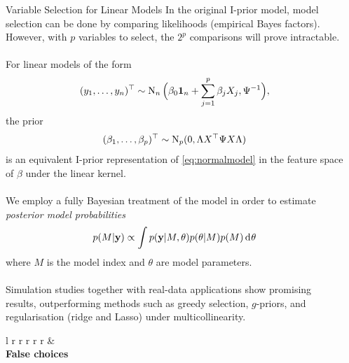 \documentclass{beamer}
\newlength{\onecolwid}
\newlength{\twocolwid}
\begin{document}
\begin{frame}[t]
\begin{columns}[t]
\begin{column}{\twocolwid}

\end{column} %



\spacercolumn
\begin{column}{\onecolwid}



\begin{block}{Variable Selection for Linear Models}
In the original I-prior model, model selection can be done by comparing likelihoods (empirical Bayes factors). However, with $p$ variables to select, the $2^p$ comparisons will prove intractable.
\\~\\[-0.8ex]
For linear models of the form
\[
  (y_1,\dots,y_n)^\top \sim \operatorname{N}_n \Big( \beta_0{\mathbf 1}_n + \sum_{j=1}^p \beta_j X_j, \Psi^{-1} \Big),
\]
the prior
\[
  (\beta_1,\dots,\beta_p)^\top \sim \operatorname{N}_p(0, \Lambda X^\top \Psi X \Lambda)
\]
is an equivalent I-prior representation of \eqref{eq:normalmodel} in the feature space of $\beta$ under the linear kernel. 
\\~\\[-0.8ex]
We employ a fully Bayesian treatment of the model in order to estimate \emph{posterior model probabilities}
\[
  p(M | {\mathbf y}) \propto \int p({\mathbf y}|M, \theta) p(\theta|M) p(M) \operatorname{d\!\:\!}\theta
\]
where $M$ is the model index and $\theta$ are model parameters.
\\~\\[-0.8ex]
Simulation studies together with real-data applications show promising results, outperforming methods such as greedy selection, $g$-priors, and regularisation (ridge and Lasso) under multicollinearity.
\vspace{-0.5cm}
\begin{table}
  \vspace{2ex}
  \begin{tabular}{l r r r r r}
  \toprule
  & \\
  \textbf{False choices}

\end{tabular}
\end{table}
\end{block}
\end{column}
\end{columns}
\end{frame}
\end{document}
